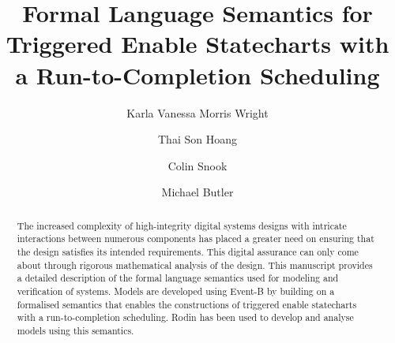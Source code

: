 \documentclass[runningheads]{llncs}
\begin{document}
%
\title{Formal Language Semantics for Triggered Enable Statecharts with a Run-to-Completion Scheduling}
%
%
\author{
Karla Vanessa Morris Wright \and
Thai Son Hoang  \and
Colin Snook \and
Michael Butler
}
%
%
%
%
\maketitle              %
%
\begin{abstract}
The increased complexity of high-integrity digital systems designs with intricate interactions between numerous components has placed a greater need on ensuring that the design satisfies its intended requirements. This digital assurance can only come about through rigorous mathematical analysis of the design. This manuscript provides a detailed description of the formal language semantics used for modeling and verification of systems. Models are developed using Event-B by building on a formalised semantics that enables the constructions of triggered enable statecharts with a run-to-completion scheduling. Rodin has been used to develop and analyse models using this semantics. 

\end{abstract}
%
%
%
\end{document}
